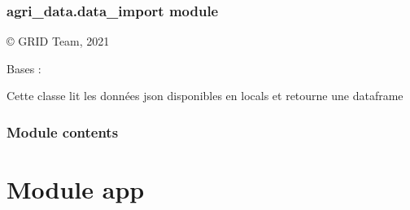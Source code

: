 \documentclass[letterpaper,10pt,french]{sphinxmanual}
\begin{document}
\subsubsection{agri\_data.data\_import module}
\label{\detokenize{agri_data:module-agri_data.data_import}}\label{\detokenize{agri_data:agri-data-data-import-module}}
\sphinxAtStartPar
© GRID Team, 2021

\begin{fulllineitems}
\label{\detokenize{agri_data:agri_data.data_import.ReadData}}
\sphinxAtStartPar
Bases : 

\sphinxAtStartPar
Cette classe lit les données json disponibles en locals et retourne une dataframe

\begin{fulllineitems}
\label{\detokenize{agri_data:agri_data.data_import.ReadData.read_json}}
\end{fulllineitems}


\end{fulllineitems}



\subsubsection{Module contents}
\label{\detokenize{agri_data:module-agri_data}}\label{\detokenize{agri_data:module-contents}}

\section{Module app}
\label{\detokenize{app:module-app}}\label{\detokenize{app:app}}\label{\detokenize{app::doc}}
\end{document}
